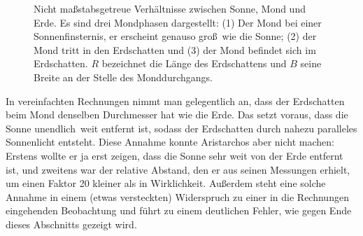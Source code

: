 \begin{figure}[htb]
\caption{\label{fig_Arist}%
Nicht ma\ss stabsgetreue Verh\"altnisse zwischen Sonne, Mond und Erde. Es sind drei
Mondphasen dargestellt: (1) Der Mond bei einer Sonnenfinsternis, er erscheint genauso gro\ss\ wie die
Sonne; (2) der Mond tritt in den Erdschatten und (3) der Mond befindet sich
im Erdschatten. $R$ bezeichnet die L\"ange des Erdschattens und $B$ seine Breite an der Stelle
des Monddurchgangs.}
\end{figure}

In vereinfachten Rechnungen nimmt man gelegentlich an, dass der Erdschatten beim Mond denselben Durchmesser
hat wie die Erde. Das setzt voraus, dass die Sonne \glqq unendlich\grqq\ weit entfernt ist, sodass der 
Erdschatten durch nahezu paralleles Sonnenlicht entsteht. Diese Annahme konnte Aristarchos aber 
nicht machen: Erstens wollte er ja erst zeigen, dass die Sonne sehr weit von der Erde entfernt ist,
und zweitens war der relative Abstand, den er aus seinen Messungen erhielt, um einen Faktor 20
kleiner als in Wirklichkeit. Au\ss erdem steht eine solche Annahme in einem (etwas versteckten) Widerspruch 
zu einer in die Rechnungen eingehenden Beobachtung und f\"uhrt zu
einem deutlichen Fehler, wie gegen Ende dieses Abschnitts gezeigt wird. 

